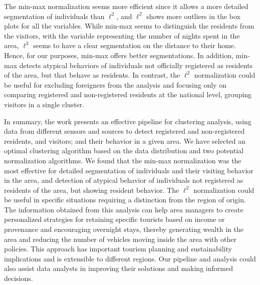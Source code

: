 The min-max normalization seems more efficient since it allows a more detailed segmentation of individuals than $\ell^2$, and $\ell^2$ shows more outliers in the box plots for all the variables. While min-max seems to distinguish the residents from the visitors, with the variable representing the number of nights spent in the area, $\ell^2$ seems to have a clear segmentation on the distance to their home. Hence, for our purposes, min-max offers better segmentations. In addition, min-max detects atypical behaviors of individuals not officially registered as residents of the area, but that behave as residents. In contrast, the $\ell^2$ normalization could be useful for excluding foreigners from the analysis and focusing only on comparing registered and non-registered residents at the national level, grouping visitors in a single cluster.


\clearpage

In summary, the work presents an effective pipeline for clustering analysis, using data from different sensors and sources to detect registered and non-registered residents, and visitors; and their behavior in a given area. We have selected an optimal clustering algorithm based on the data distribution and two potential normalization algorithms. We found that the min-max normalization was the most effective for detailed segmentation of individuals and their visiting behavior in the area, and detection of atypical behavior of individuals not registered as residents of the area, but showing resident behavior. The $\ell^2$ normalization could be useful in specific situations requiring a distinction from the region of origin. The information obtained from this analysis can help area managers to create personalized strategies for retaining specific tourists based on income or provenance and encouraging overnight stays, thereby generating wealth in the area and reducing the number of vehicles moving inside the area with other policies. This approach has important tourism planning and sustainability implications and is extensible to different regions. Our pipeline and analysis could also assist data analysts in improving their solutions and making informed decisions.